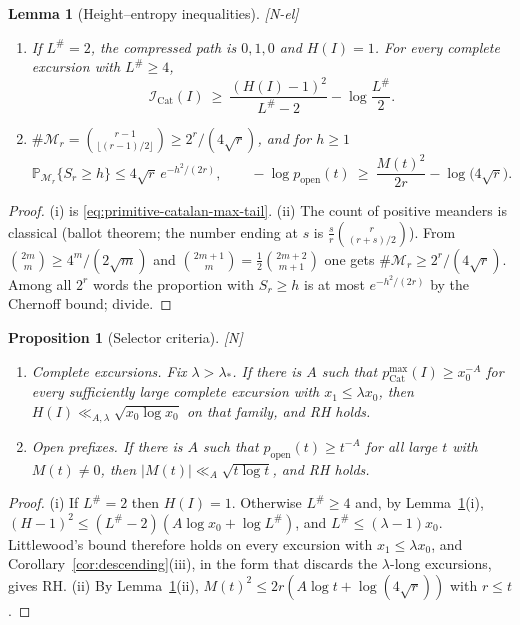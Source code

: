 \documentclass[11pt,reqno]{amsart}
\numberwithin{equation}{section}
\theoremstyle{plain}
\newtheorem{proposition}[theorem]{Proposition}
\newtheorem{lemma}[theorem]{Lemma}
\theoremstyle{definition}
\theoremstyle{remark}
\newcommand{\tagN}{\textup{[N]}}
\newcommand{\tagNE}{\textup{[N-el]}}
\begin{document}
\begin{lemma}[Height--entropy inequalities]
\label{lem:height-entropy}
\tagNE\ \begin{enumerate}[label=\textup{(\roman*)}]
\item If $L^\#=2$, the compressed path is $0,1,0$ and $H(I)=1$. For every
complete excursion with $L^\#\ge4$,
\begin{equation}
\mathcal I_{\mathrm{Cat}}(I)\ \ge\ \frac{(H(I)-1)^2}{L^\#-2}-\log\frac{L^\#}2 .
\end{equation}
\item $\#\mathcal M_r=\binom{r-1}{\lfloor(r-1)/2\rfloor}\ge2^r/(4\sqrt r)$,
and for $h\ge1$
\begin{equation}
\mathbb P_{\mathcal M_r}\{S_r\ge h\}\le4\sqrt r\,e^{-h^2/(2r)},
\qquad
-\log p_{\mathrm{open}}(t)\ \ge\ \frac{M(t)^2}{2r}-\log\bigl(4\sqrt r\bigr).
\end{equation}
\end{enumerate}
\end{lemma}

\begin{proof}
(i) is \eqref{eq:primitive-catalan-max-tail}. (ii) The count of positive
meanders is classical (ballot theorem; the number ending at $s$ is
$\frac sr\binom{r}{(r+s)/2}$). From
$\binom{2m}{m}\ge4^m/(2\sqrt m)$ and
$\binom{2m+1}{m}=\frac12\binom{2m+2}{m+1}$ one gets
$\#\mathcal M_r\ge2^r/(4\sqrt r)$. Among all $2^r$ words the proportion with
$S_r\ge h$ is at most $e^{-h^2/(2r)}$ by the Chernoff bound; divide.
\end{proof}

\begin{proposition}[Selector criteria]
\label{prop:selector-criteria}
\tagN\ \begin{enumerate}[label=\textup{(\roman*)}]
\item \emph{Complete excursions.} Fix $\lambda>\lambda_*$. If there is $A$
such that $p^{\max}_{\mathrm{Cat}}(I)\ge x_0^{-A}$ for every sufficiently
large complete excursion with $x_1\le\lambda x_0$, then
$H(I)\ll_{A,\lambda}\sqrt{x_0\log x_0}$ on that family, and RH holds.
\item \emph{Open prefixes.} If there is $A$ such that
$p_{\mathrm{open}}(t)\ge t^{-A}$ for all large $t$ with $M(t)\ne0$, then
$|M(t)|\ll_A\sqrt{t\log t}$, and RH holds.
\end{enumerate}
\end{proposition}

\begin{proof}
(i) If $L^\#=2$ then $H(I)=1$. Otherwise $L^\#\ge4$ and, by
Lemma~\ref{lem:height-entropy}(i), $(H-1)^2\le(L^\#-2)(A\log x_0+\log L^\#)$, and $L^\#\le(\lambda-1)x_0$.
Littlewood's bound therefore holds on every excursion with
$x_1\le\lambda x_0$, and Corollary~\ref{cor:descending}(iii), in the form
that discards the $\lambda$-long excursions, gives RH.
(ii) By Lemma~\ref{lem:height-entropy}(ii),
$M(t)^2\le2r(A\log t+\log(4\sqrt r))$ with $r\le t$.
\end{proof}
\end{document}
